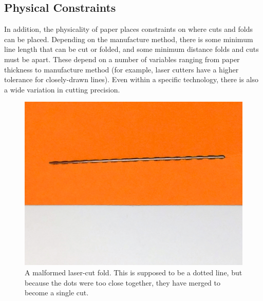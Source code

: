 \subsection{Physical Constraints}\label{physical-constraints}

In addition, the physicality of paper places constraints on where cuts
and folds can be placed. Depending on the manufacture method, there is
some minimum line length that can be cut or folded, and some minimum
distance folds and cuts must be apart. These depend on a number of
variables ranging from paper thickness to manufacture method (for
example, laser cutters have a higher tolerance for closely-drawn lines).
Even within a specific technology, there is also a wide variation in
cutting precision.

\begin{figure}[htbp]
\centering
\includegraphics{figures/45_Tech_Constraints/tooclosecuts.jpg}
\caption{A malformed laser-cut fold. This is supposed to be a dotted
line, but because the dots were too close together, they have merged to
become a single cut.}
\end{figure}

